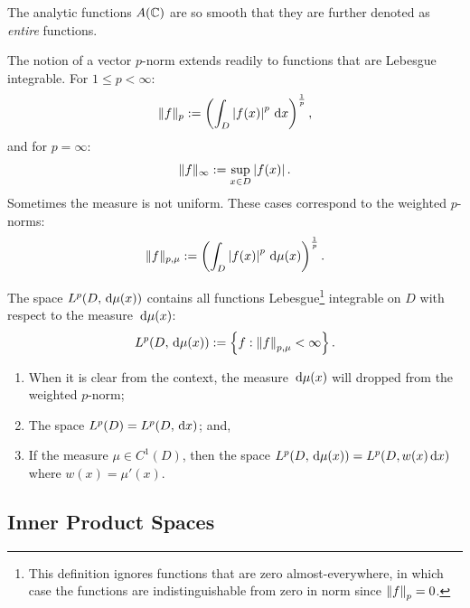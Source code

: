 The analytic functions $A(\mathbb{C})$ are so smooth that they are further denoted as {\em entire} functions.

The notion of a vector $p$-norm extends readily to functions that are Lebesgue integrable. For $1\le p < \infty$:
\begin{equation}
\|f\|_p := \left(\int_D\left|{f(x)}\right|^p{\rm\,d} x\right)^{\frac{1}{p}},
\end{equation}
and for $p=\infty$:
\begin{equation}
\|f\|_\infty := \sup_{x\in D} \left|{f(x)}\right|.
\end{equation}
Sometimes the measure is not uniform. These cases correspond to the weighted $p$-norms:
\begin{equation}
\|f\|_{p,\mu} := \left(\int_D\left|{f(x)}\right|^p{\rm\,d}\mu(x)\right)^{\frac{1}{p}}.
\end{equation}

\begin{definition}
The space $L^p(D,{\rm\,d}\mu(x))$ contains all functions Lebesgue\footnote{This definition ignores functions that are zero almost-everywhere, in which case the functions are indistinguishable from zero in norm since $\left\|{f}\right\|_p=0$.} integrable on $D$ with respect to the measure ${\rm\,d}\mu(x)$:
\begin{equation}
L^p(D,{\rm\,d}\mu(x)) := \left\{ f : \left\|{f}\right\|_{p,\mu} < \infty \right\}.
\end{equation}
\end{definition}

\begin{remark}
\begin{enumerate}
\item When it is clear from the context, the measure ${\rm\,d}\mu(x)$ will dropped from the weighted $p$-norm;
\item The space $L^p(D) = L^p(D,{\rm\,d} x)$; and,
\item If the measure $\mu \in C^1(D)$, then the space $L^p(D,{\rm\,d}\mu(x)) = L^p(D,w(x){\rm\,d}x)$ where $w(x) = \mu'(x)$.
\end{enumerate}
\end{remark}

\subsection{Inner Product Spaces}

